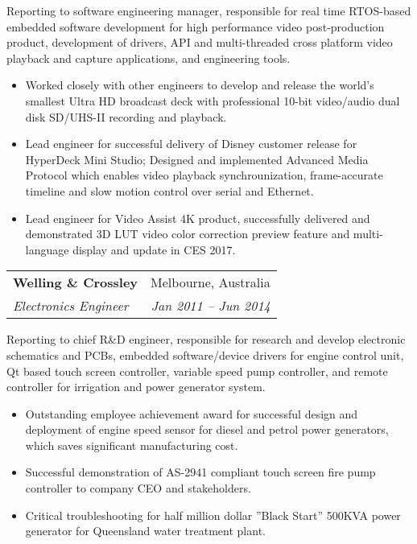 \documentclass[letterpaper,11pt]{article}
\makeatletter
\newcommand{\resumeItemNoBullet}[4]{
  \vspace{-1pt}
    \begin{tabular*}{0.97\textwidth}{l@{\extracolsep{\fill}}r}
      \textbf{#1} & #2 \\
      \textit{\small#3} & \textit{\small #4} \\
    \end{tabular*}\vspace{-7pt}
}
\newcommand{\resumeSubHeadingListStart}{\begin{itemize}[leftmargin=*]}
\newcommand{\resumeSubHeadingListEnd}{\end{itemize}}
\makeatother
\begin{document}
\vspace{10pt}
{Reporting to software engineering manager, responsible for real time RTOS-based embedded software development for high performance video post-production product, development of drivers, API and multi-threaded cross platform video playback and capture applications, and engineering tools.}
  \resumeSubHeadingListStart
    \item Worked closely with other engineers to develop and release the world’s smallest Ultra HD broadcast deck with professional 10-bit video/audio dual disk SD/UHS-II recording and playback. 
    \item Lead engineer for successful delivery of Disney customer release for HyperDeck Mini Studio; Designed and implemented Advanced Media Protocol which enables video playback synchrounization, frame-accurate timeline and slow motion control over serial and Ethernet.
    \item Lead engineer for Video Assist 4K product, successfully delivered and demonstrated 3D LUT video color correction preview feature and multi-language display and update in CES 2017.
  \resumeSubHeadingListEnd

\resumeItemNoBullet
{Welling \& Crossley}{Melbourne, Australia}
{Electronics Engineer}{Jan 2011 -- Jun 2014}

\vspace{10pt}
{ Reporting to chief R\&D engineer, responsible for research and develop electronic schematics and PCBs, embedded software/device drivers for engine control unit, Qt based touch screen controller, variable speed pump controller, and remote controller for irrigation and power generator system. }
  \resumeSubHeadingListStart
    \item Outstanding employee achievement award for successful design and deployment of engine speed sensor for diesel and petrol power generators, which saves significant manufacturing cost.
    \item Successful demonstration of AS-2941 compliant touch screen fire pump controller to company CEO and stakeholders. 
    \item Critical troubleshooting for half million dollar ”Black Start” 500KVA power generator for Queensland water treatment plant. 
  \resumeSubHeadingListEnd

\end{document}
